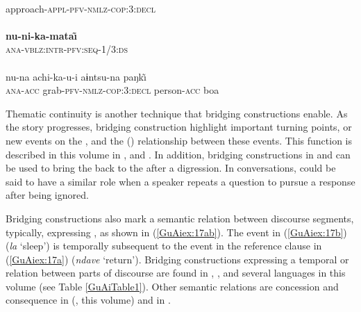 \documentclass[output=paper]{LSP/langsci}
\begin{document}
\begin{exe}
\ex \label{GuAiex:36ac}
\begin{xlist}
\ex \label{GuAiex:36a}
\gll \underline{}\\
 approach-\textsc{appl-pfv-nmlz-cop:3:decl}\\
\glt {} \\
\ex \label{GuAiex:36b}
\gll  \textbf{nu-ni-ka-mata\~\i}\\
\textsc{ana-vblz:intr}{}-\textsc{pfv:seq-1/3:ds}\\
\glt {}\\
\ex \label{GuAiex:36c}
\gll  nu-na         achi-ka-u-i                         aɨntsu-na   paŋk\~\i\\
\textsc{ana-acc}   grab-\textsc{pfv-nmlz-cop:3:decl}   person-\textsc{acc}   boa\\
\glt {}
\end{xlist}
\end{exe}


Thematic continuity is another  technique that bridging constructions enable. As the story progresses, bridging construction highlight important turning points, or new events on the , and the () relationship between these events. This function is described in this volume in ,  and . In addition, bridging constructions in  and  can be used to bring the  back to the  after a digression. In  conversations,  could be said to have a similar role when a speaker repeats a question to pursue a response after being ignored.

Bridging constructions also mark a semantic relation between discourse segments, typically, expressing , as shown in (\ref{GuAiex:17ab}). The event in (\ref{GuAiex:17b}) (\textit{la} `sleep') is temporally subsequent to the event in the reference clause in (\ref{GuAiex:17a}) (\textit{ndave} `return'). Bridging constructions expressing a temporal or  relation between parts of discourse are found in  \citep[][314]{bromley81},  \citep[][516]{kasia17}, and several languages in this volume (see Table \ref{GuAiTable1}). Other semantic relations are concession and consequence in  (\citeauthor{aiton18}, this volume) and in  \citep[][499--502]{overall17}. 
\end{document}
